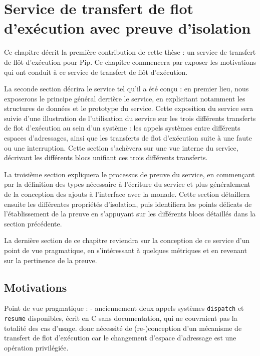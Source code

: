 \chapter{Service de transfert de flot d'exécution avec preuve d'isolation}

Ce chapitre décrit la première contribution de cette thèse : un service de transfert de flôt d'exécution pour Pip. Ce chapitre commencera par exposer les motivations qui ont conduit à ce service de transfert de flôt d'exécution.

La seconde section décrira le service tel qu'il a été conçu : en premier lieu, nous exposerons le principe général derrière le service, en explicitant notamment les structures de données et le prototype du service. Cette exposition du service sera suivie d'une illustration de l'utilisation du service sur les trois différents transferts de flot d'exécution au sein d'un système : les appels systèmes entre différents espaces d'adressages, ainsi que les transferts de flot d'exécution suite à une faute ou une interruption. Cette section s'achèvera sur une vue interne du service, décrivant les différents blocs unifiant ces trois différents transferts.

La troisième section expliquera le processus de preuve du service, en commençant par la définition des types nécessaire à l'écriture du service et plus généralement de la conception des ajouts à l'interface avec la monade. Cette section détaillera ensuite les différentes propriétés d'isolation, puis identifiera les points délicats de l'établissement de la preuve en s'appuyant sur les différents blocs détaillés dans la section précédente.

La dernière section de ce chapitre reviendra sur la conception de ce service d'un point de vue pragmatique, en s'intéressant à quelques métriques et en revenant sur la pertinence de la preuve.


	\section{Motivations}

		Point de vue pragmatique :
			- anciennement deux appels systèmes \texttt{dispatch} et \texttt{resume} disponibles, écrit en C sans documentation, qui ne couvraient pas la totalité des cas d'usage.
			  donc nécessité de (re-)conception d'un mécanisme de transfert de flot d'exécution car le changement d'espace d'adressage est une opération privilégiée.

